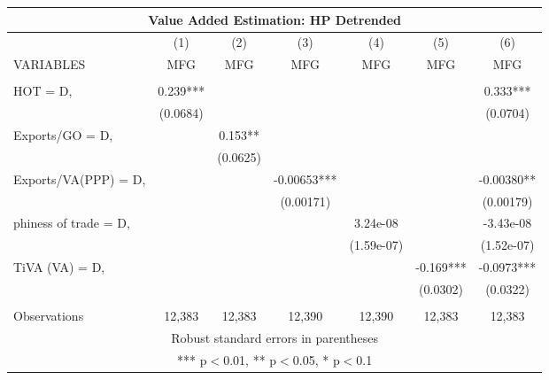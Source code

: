 \documentclass[]{article}
\begin{document}
\begin{tabular}{lcccccc}
\multicolumn{7}{c}{Value Added Estimation: HP Detrended} \\ \hline
 & (1) & (2) & (3) & (4) & (5) & (6) \\
VARIABLES & MFG & MFG & MFG & MFG & MFG & MFG \\ \hline
 &  &  &  &  &  &  \\
HOT = D, & 0.239*** &  &  &  &  & 0.333*** \\
 & (0.0684) &  &  &  &  & (0.0704) \\
Exports/GO = D, &  & 0.153** &  &  &  &  \\
 &  & (0.0625) &  &  &  &  \\
Exports/VA(PPP) = D, &  &  & -0.00653*** &  &  & -0.00380** \\
 &  &  & (0.00171) &  &  & (0.00179) \\
phiness of trade = D, &  &  &  & 3.24e-08 &  & -3.43e-08 \\
 &  &  &  & (1.59e-07) &  & (1.52e-07) \\
TiVA (VA) = D, &  &  &  &  & -0.169*** & -0.0973*** \\
 &  &  &  &  & (0.0302) & (0.0322) \\
 &  &  &  &  &  &  \\
 Observations & 12,383 & 12,383 & 12,390 & 12,390 & 12,383 & 12,383 \\ \hline
\multicolumn{7}{c}{ Robust standard errors in parentheses} \\
\multicolumn{7}{c}{ *** p$<$0.01, ** p$<$0.05, * p$<$0.1} \\
\end{tabular}
\end{document}
